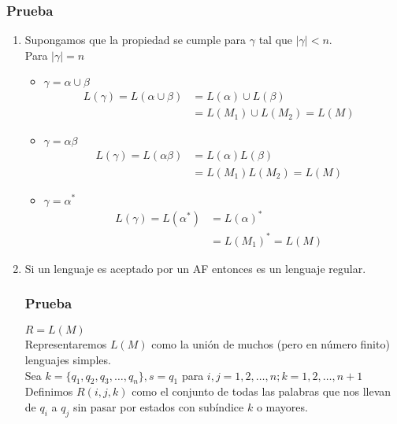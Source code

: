 \subsubsection*{Prueba}
\begin{enumerate}
\item Supongamos que la propiedad se cumple para $\gamma$ tal que $|\gamma| < n$.\\${ }$\\ Para $|\gamma|=n$
\begin{itemize}
\item $\gamma=\alpha\cup\beta$
\begin{align*}
L(\gamma) = L(\alpha\cup\beta)&= L(\alpha)\cup L(\beta) & \\
	                       &= L(M_1)\cup L(M_2)      =L(M)
\end{align*}
\item $\gamma=\alpha\beta$
\begin{align*}
L(\gamma) = L(\alpha\beta)&= L(\alpha) L(\beta) & \\
	                       &= L(M_1) L(M_2)      =L(M)
\end{align*}
\item $\gamma=\alpha^*$
\begin{align*}
L(\gamma) = L(\alpha^*)&= L(\alpha)^* & \\
	                       &= L(M_1)^*      =L(M)
\end{align*}
\end{itemize}
\item Si un lenguaje es aceptado por un AF entonces es un lenguaje regular.
\subsubsection*{Prueba}
$R=L(M)$ \\
Representaremos $L(M)$ como la unión de muchos (pero en número finito) lenguajes simples.
\\${ }$\\
Sea $k=\{q_1,q_2,q_3,\ldots,q_n \} , s =q_1$ para $i,j = 1,2,\ldots,n ; k = 1,2,\ldots,n+1$ \\ ${ }$\\
Definimos $R(i,j,k)$ como el conjunto de todas las palabras que nos llevan de $q_i$ a $q_j$ sin pasar por estados con subíndice $k$ o mayores.

\end{enumerate}
